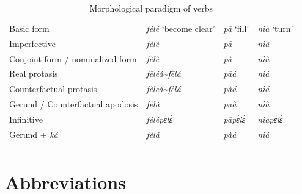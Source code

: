 \documentclass[output=paper,colorlinks,citecolor=brown]{langscibook}
\begin{document}
\begin{table}
    \centering 
\begin{tabularx}{\textwidth}{llll}
\lsptoprule
 Basic form                         &  \textit{félé} ‘become clear’ &  \textit{pā} ‘fill’   &  \textit{nìà} ‘turn’\\
 Imperfective                       &  \textit{fèlè}                         &  \textit{pā}                   &  \textit{nìà}\\
 Conjoint form / nominalized form   &  \textit{fèlè}                         &  \textit{pà}                   &  \textit{nìà}\\
 Real protasis                      &  \textit{fēléá{\textasciitilde}fēlá} &  \textit{pāá}                  &  \textit{nìá}\\
 Counterfactual protasis            &  \textit{fèlēá{\textasciitilde}fèlá}                  &  \textit{pàá}                  &  \textit{nìá}\\
 Gerund / Counterfactual apodosis   &  \textit{félà}                         &  \textit{pāà}                  &  \textit{nìà}\\
 Infinitive                         &  \textit{félépɛ̀lɛ̀}                     &  \textit{pāpɛ̀lɛ̀}               &  \textit{nìàpɛ̀lɛ̀}\\
 Gerund + \textit{ká}               &  \textit{fèlá}                         &  \textit{pàá}                  &  \textit{nìá}\\
\lspbottomrule
\end{tabularx}
\caption{Morphological paradigm of verbs}
\label{tab:mano:app:2}
\end{table}


\newpage 
\section*{Abbreviations}
\end{document}
